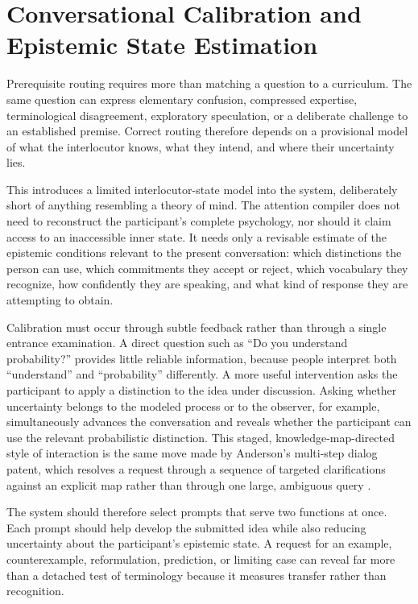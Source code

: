 \documentclass[11pt]{article}
\begin{document}
\section{Conversational Calibration and Epistemic State Estimation}

Prerequisite routing requires more than matching a question to a curriculum. The same question can express elementary confusion, compressed expertise, terminological disagreement, exploratory speculation, or a deliberate challenge to an established premise. Correct routing therefore depends on a provisional model of what the interlocutor knows, what they intend, and where their uncertainty lies.

This introduces a limited interlocutor-state model into the system, deliberately short of anything resembling a theory of mind. The attention compiler does not need to reconstruct the participant's complete psychology, nor should it claim access to an inaccessible inner state. It needs only a revisable estimate of the epistemic conditions relevant to the present conversation: which distinctions the person can use, which commitments they accept or reject, which vocabulary they recognize, how confidently they are speaking, and what kind of response they are attempting to obtain.

Calibration must occur through subtle feedback rather than through a single entrance examination. A direct question such as ``Do you understand probability?'' provides little reliable information, because people interpret both ``understand'' and ``probability'' differently. A more useful intervention asks the participant to apply a distinction to the idea under discussion. Asking whether uncertainty belongs to the modeled process or to the observer, for example, simultaneously advances the conversation and reveals whether the participant can use the relevant probabilistic distinction. This staged, knowledge-map-directed style of interaction is the same move made by Anderson's multi-step dialog patent, which resolves a request through a sequence of targeted clarifications against an explicit map rather than through one large, ambiguous query \cite{anderson2009dialog}.

The system should therefore select prompts that serve two functions at once. Each prompt should help develop the submitted idea while also reducing uncertainty about the participant's epistemic state. A request for an example, counterexample, reformulation, prediction, or limiting case can reveal far more than a detached test of terminology because it measures transfer rather than recognition.
\end{document}
